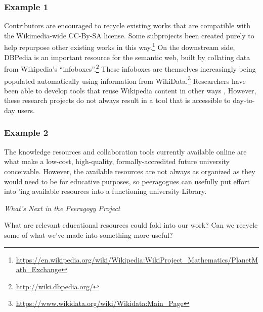 
\subsubsection*{Example 1}
Contributors are encouraged to recycle existing works that are compatible
with the Wikimedia-wide CC-By-SA license.
Some subprojects been created purely to help repurpose other existing works in this
way.\footnote{\url{https://en.wikipedia.org/wiki/Wikipedia:WikiProject_Mathematics/PlanetMath_Exchange}}
%
On the downstream side, DBPedia is an important resource for the
semantic web, built by collating data from Wikipedia's
``infoboxes''.\footnote{\url{http://wiki.dbpedia.org/}}
%
These infoboxes are themselves increasingly being populated
automatically using information from WikiData.\footnote{\url{https://www.wikidata.org/wiki/Wikidata:Main_Page}}
Researchers have been able to develop tools that reuse Wikipedia content in other ways \cite{reinhold2006wikitrails,riche2010ichase},
However, these research projects do not always result in a tool that
is accessible to day-to-day users.

\vspace{.05cm}

\subsubsection*{Example 2}
The knowledge resources and collaboration tools currently available online
are what make a low-cost, high-quality, formally-accredited future university
conceivable.  However, the available resources are not always as
organized as they would need to be for educative purposes, so peeragogues can usefully put
effort into 'ing available
resources into a functioning university Library.


\begin{framed}
\noindent 
\emph{What's Next in the Peeragogy Project}
\begin{collectinmacro}{\ReduceWN}{}{}
What are relevant educational resources could fold into our work?
Can we recycle some of what we've made into something more useful?  
\end{collectinmacro}
\ReduceWN
\end{framed}

\newpage
